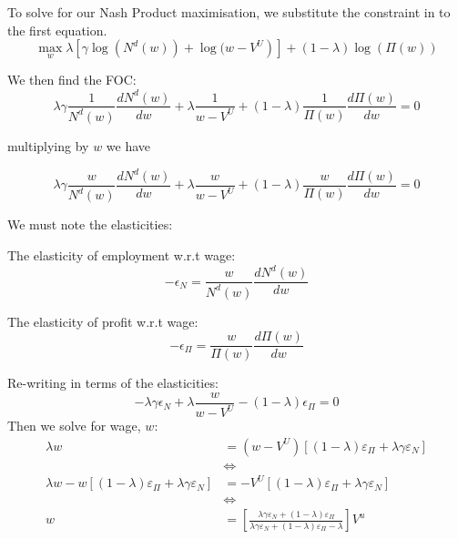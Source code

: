 \documentclass[11pt]{article}
\begin{document}
\begin{deriv}
    To solve for our Nash Product maximisation, we substitute the constraint in to the first equation.
    \begin{equation}
\max _w \lambda\left[\gamma \log \left(N^d(w)\right)+\log (\right.  \left.\left.w-V^U\right)\right] +(1-\lambda) \log (\Pi(w))
\end{equation}

We then find the FOC:
\begin{equation}
\lambda \gamma \frac{1}{N^d(w)} \frac{d N^d(w)}{d w}+\lambda \frac{1}{w-V^U}+(1-\lambda) \frac{1}{\Pi(w)} \frac{d \Pi(w)}{d w}=0
\end{equation}

multiplying by $w$ we have

\begin{equation}
\lambda \gamma \frac{w}{N^d(w)} \frac{d N^d(w)}{d w}+\lambda \frac{w}{w-V^U}+(1-\lambda) \frac{w}{\Pi(w)} \frac{d \Pi(w)}{d w}=0
\end{equation}

\begin{note}
    We must note the elasticities:

    The elasticity of employment w.r.t wage:
    \begin{equation}
        \label{elasticity of employment wrt wage}
        -\epsilon_N = \frac{w}{N^d(w)} \frac{d N^d(w)}{d w}
    \end{equation}

    The elasticity of profit w.r.t wage:
    \begin{equation}
        \label{elasticity of profit wrt wage}
        -\epsilon_\Pi = \frac{w}{\Pi(w)} \frac{d \Pi(w)}{d w}
    \end{equation}
\end{note}

Re-writing in terms of the elasticities:
\begin{equation}
    -\lambda\gamma\epsilon_N + \lambda \dfrac{w}{w-V^U}-(1-\lambda)\epsilon_\Pi = 0
\end{equation}
Then we solve for wage, $w$:
\begin{equation}
\begin{aligned}
\lambda w & =\left(w-V^U\right)\left[(1-\lambda) \varepsilon_{\Pi}+\lambda \gamma \varepsilon_N\right] \\
& \Longleftrightarrow \\
\lambda w-w\left[(1-\lambda) \varepsilon_{\Pi}+\lambda \gamma \varepsilon_N\right] & =-V^U\left[(1-\lambda) \varepsilon_{\Pi}+\lambda \gamma \varepsilon_N\right] \\
& \Longleftrightarrow \\
w & =\left[\frac{\lambda \gamma \varepsilon_N+(1-\lambda) \varepsilon_{\Pi}}{\lambda \gamma \varepsilon_N+(1-\lambda) \varepsilon_{\Pi}-\lambda}\right] V^u
\end{aligned}
\end{equation}


\end{deriv}
\end{document}
